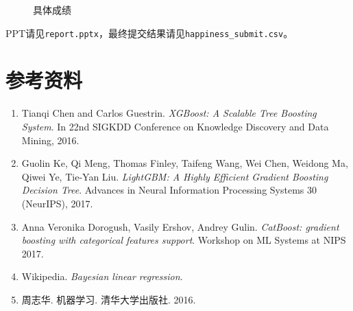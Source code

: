 \documentclass[logo,reportComp]{thesis}
\begin{document}
\begin{figure}[H]
\centering
{}
\quad
{}
\caption{具体成绩}
\label{fig:detail}
\end{figure}

PPT请见\verb'report.pptx'，最终提交结果请见\verb'happiness_submit.csv'。

\section{参考资料}
\begin{enumerate}
	\item Tianqi Chen and Carlos Guestrin. \emph{XGBoost: A Scalable Tree Boosting System}. In 22nd SIGKDD Conference on Knowledge Discovery and Data Mining, 2016.
	\item Guolin Ke, Qi Meng, Thomas Finley, Taifeng Wang, Wei Chen, Weidong Ma, Qiwei Ye, Tie-Yan Liu. \emph{LightGBM: A Highly Efficient Gradient Boosting Decision Tree}. Advances in Neural Information Processing Systems 30 (NeurIPS), 2017.
	\item Anna Veronika Dorogush, Vasily Ershov, Andrey Gulin. \emph{CatBoost: gradient boosting with categorical features support}. Workshop on ML Systems at NIPS 2017.
	\item Wikipedia. \emph{Bayesian linear regression}.
	\item 周志华. 机器学习. 清华大学出版社. 2016.
\end{enumerate}
\end{document}
